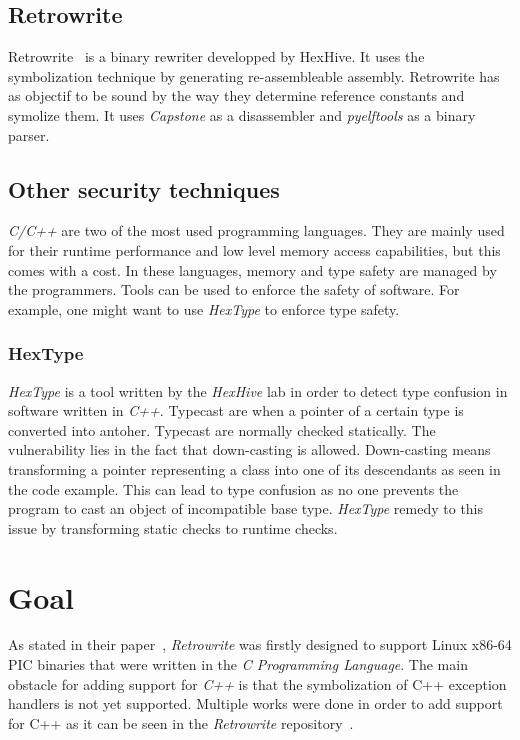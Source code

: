 \documentclass[a4paper,11pt,oneside]{report}
\begin{document}
\section{Retrowrite}
Retrowrite~\cite{dinesh20oakland} is a binary rewriter developped by HexHive.
It uses the symbolization technique by generating re-assembleable assembly.
Retrowrite has as objectif to be sound by the way they determine reference
constants and symolize them. It uses
\textit{Capstone} as a disassembler and \textit{pyelftools} as a binary parser.

\section{Other security techniques}
\textit{C/C++} are two of the most used programming languages. They are
mainly used for their runtime performance and low level memory access
capabilities, but this comes with a cost. In these languages, memory and type
safety are managed by the programmers. Tools can be used to enforce the safety
of software. For example, one might want to use \textit{HexType} to enforce
type safety.

\subsection{HexType}
\textit{HexType} is a tool written by the \textit{HexHive} lab in order to
detect type confusion in software written in \textit{C++}. Typecast are when a
pointer of a certain type is converted into antoher. Typecast are
normally checked statically. The vulnerability lies in the fact that
down-casting is allowed. Down-casting means transforming a pointer representing
a class into one of its descendants as seen in the code example. This can lead
to type confusion as no one prevents the program to cast an object of
incompatible base type. \textit{HexType} remedy to this issue by transforming
static checks to runtime checks.





\chapter{Goal}
As stated in their paper~\cite{dinesh20oakland}, \textit{Retrowrite} was
firstly designed to support Linux x86-64 PIC binaries that were written in the
\textit{C Programming Language}. The main obstacle for adding support for
\textit{C++} is that the symbolization of C++ exception
handlers is not yet supported. Multiple works were done in order to add support
for C++ as it can be seen in the \textit{Retrowrite} repository~\cite{gitCommit}.
\end{document}
